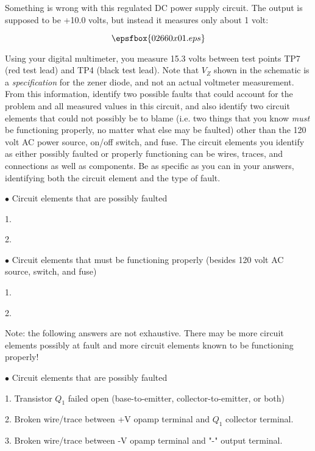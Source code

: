 

Something is wrong with this regulated DC power supply circuit.  The output is supposed to be +10.0 volts, but instead it measures only about 1 volt:

$$\epsfbox{02660x01.eps}$$

Using your digital multimeter, you measure 15.3 volts between test points TP7 (red test lead) and TP4 (black test lead).  Note that $V_Z$ shown in the schematic is a {\it specification} for the zener diode, and not an actual voltmeter measurement.  From this information, identify two possible faults that could account for the problem and all measured values in this circuit, and also identify two circuit elements that could not possibly be to blame (i.e. two things that you know {\it must} be functioning properly, no matter what else may be faulted) other than the 120 volt AC power source, on/off switch, and fuse.  The circuit elements you identify as either possibly faulted or properly functioning can be wires, traces, and connections as well as components.  Be as specific as you can in your answers, identifying both the circuit element and the type of fault.

\medskip
\goodbreak
\item{$\bullet$} Circuit elements that are possibly faulted
\item{1.}
\item{2.} 
\medskip

\medskip
\goodbreak
\item{$\bullet$} Circuit elements that must be functioning properly (besides 120 volt AC source, switch, and fuse)
\item{1.} 
\item{2.} 
\medskip







Note: the following answers are not exhaustive.  There may be more circuit elements possibly at fault and more circuit elements known to be functioning properly!

\medskip
\goodbreak
\item{$\bullet$} Circuit elements that are possibly faulted
\item{1.} Transistor $Q_1$ failed open (base-to-emitter, collector-to-emitter, or both)
\item{2.} Broken wire/trace between +V opamp terminal and $Q_1$ collector terminal.
\item{3.} Broken wire/trace between -V opamp terminal and "-" output terminal.
\medskip

